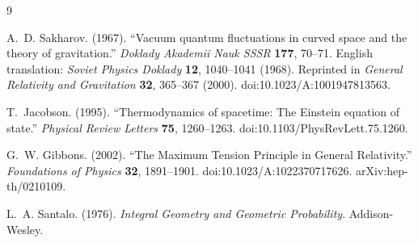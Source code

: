 
\begin{thebibliography}{9}

A.~D. Sakharov. (1967).
``Vacuum quantum fluctuations in curved space and the theory of gravitation.''
\emph{Doklady Akademii Nauk SSSR} \textbf{177}, 70--71.
English translation: \emph{Soviet Physics Doklady} \textbf{12}, 1040--1041 (1968).
Reprinted in \emph{General Relativity and Gravitation} \textbf{32}, 365--367 (2000).
doi:10.1023/A:1001947813563.

T.~Jacobson. (1995).
``Thermodynamics of spacetime: The Einstein equation of state.''
\emph{Physical Review Letters} \textbf{75}, 1260--1263.
doi:10.1103/PhysRevLett.75.1260.

G.~W. Gibbons. (2002).
``The Maximum Tension Principle in General Relativity.''
\emph{Foundations of Physics} \textbf{32}, 1891--1901.
doi:10.1023/A:1022370717626.
arXiv:hep-th/0210109.

L.~A. Santalo. (1976).
\emph{Integral Geometry and Geometric Probability}.
Addison-Wesley.

\end{thebibliography}

